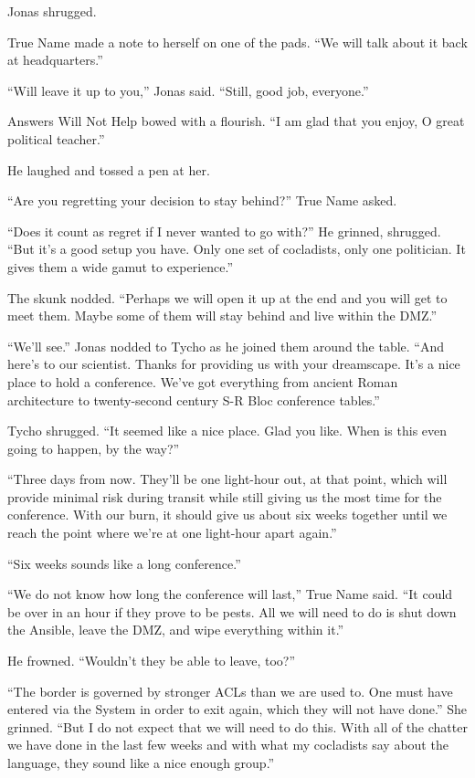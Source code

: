 Jonas shrugged.

True Name made a note to herself on one of the pads. ``We will talk about it back at headquarters.''

``Will leave it up to you,'' Jonas said. ``Still, good job, everyone.''

Answers Will Not Help bowed with a flourish. ``I am glad that you enjoy, O great political teacher.''

He laughed and tossed a pen at her.

``Are you regretting your decision to stay behind?'' True Name asked.

``Does it count as regret if I never wanted to go with?'' He grinned, shrugged. ``But it's a good setup you have. Only one set of cocladists, only one politician. It gives them a wide gamut to experience.''

The skunk nodded. ``Perhaps we will open it up at the end and you will get to meet them. Maybe some of them will stay behind and live within the DMZ.''

``We'll see.'' Jonas nodded to Tycho as he joined them around the table. ``And here's to our scientist. Thanks for providing us with your dreamscape. It's a nice place to hold a conference. We've got everything from ancient Roman architecture to twenty-second century S-R Bloc conference tables.''

Tycho shrugged. ``It seemed like a nice place. Glad you like. When is this even going to happen, by the way?''

``Three days from now. They'll be one light-hour out, at that point, which will provide minimal risk during transit while still giving us the most time for the conference. With our burn, it should give us about six weeks together until we reach the point where we're at one light-hour apart again.''

``Six weeks sounds like a long conference.''

``We do not know how long the conference will last,'' True Name said. ``It could be over in an hour if they prove to be pests. All we will need to do is shut down the Ansible, leave the DMZ, and wipe everything within it.''

He frowned. ``Wouldn't they be able to leave, too?''

``The border is governed by stronger ACLs than we are used to. One must have entered via the System in order to exit again, which they will not have done.'' She grinned. ``But I do not expect that we will need to do this. With all of the chatter we have done in the last few weeks and with what my cocladists say about the language, they sound like a nice enough group.''

